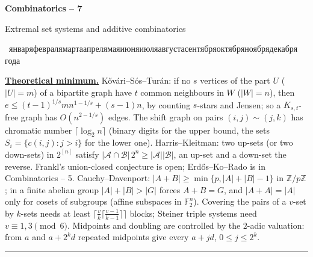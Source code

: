 \documentclass[11pt,a4paper]{article}
\newcommand{\head}[1]{\par\medskip\noindent\textbf{\underline{#1}}\quad}
\newcommand{\sheettitle}[3]{%
  \begin{center}
  {\huge\bfseries #1\par}\vspace{1.2em}
  {\Large #2\par}\vspace{0.8em}
  \if\relax\detokenize{#3}\relax\else{\Large #3\par}\vspace{0.8em}\fi
  {\rudate\par}
  \end{center}\vspace{0.5em}}
\newcommand{\rudate}{\foreignlanguage{russian}{\number\day~\ifcase\month\or января\or февраля\or марта\or апреля\or мая\or июня\or июля\or августа\or сентября\or октября\or ноября\or декабря\fi\ \number\year~года}}
\begin{document}
\sheettitle{Combinatorics -- 7}{Extremal set systems and additive combinatorics}{Homework}

\head{Theoretical minimum.} K\H{o}v\'ari--S\'os--Tur\'an: if no $s$ vertices of the part $U$
($|U|=m$) of a bipartite graph have $t$ common neighbours in $W$ ($|W|=n$), then
$e\leqslant(t-1)^{1/s}mn^{1-1/s}+(s-1)n$, by counting $s$-stars and Jensen; so a $K_{s,t}$-free
graph has $O(n^{2-1/s})$ edges. The shift graph on pairs $(i,j)\sim(j,k)$ has chromatic number
$\lceil\log_2n\rceil$ (binary digits for the upper bound, the sets $S_i=\{c(i,j):j>i\}$ for
the lower one). Harris--Kleitman: two up-sets (or two down-sets) in $2^{[n]}$ satisfy
$|\mathcal A\cap\mathcal B|\,2^n\geqslant|\mathcal A||\mathcal B|$, an up-set and a down-set the
reverse. Frankl's union-closed conjecture is open; Erd\H{o}s--Ko--Rado is in
Combinatorics -- 5. Cauchy--Davenport: $|A+B|\geqslant\min\{p,|A|+|B|-1\}$ in
$\mathbb Z/p\mathbb Z$; in a finite abelian group $|A|+|B|>|G|$ forces $A+B=G$, and $|A+A|=|A|$
only for cosets of subgroups (affine subspaces in $\mathbb F_2^n$). Covering the pairs of a
$v$-set by $k$-sets needs at least $\lceil\frac vk\lceil\frac{v-1}{k-1}\rceil\rceil$ blocks;
Steiner triple systems need $v\equiv1,3\pmod6$. Midpoints and doubling are controlled by the
$2$-adic valuation: from $a$ and $a+2^kd$ repeated midpoints give every $a+jd$,
$0\leqslant j\leqslant 2^k$.

\medskip\noindent\rule{\linewidth}{0.4pt}
\end{document}
